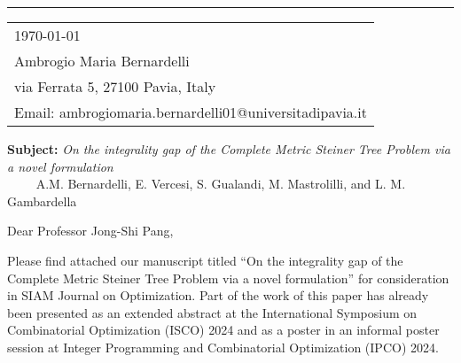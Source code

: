 \documentclass{article}
\begin{document}


\vspace{-1em} %

\rule{\linewidth}{1pt} %

\bigskip\bigskip %


\hfill
\begin{tabular}{l @{}}
	\today \bigskip\\ %
	Ambrogio Maria Bernardelli \\
	via Ferrata 5, 27100 Pavia, Italy \\ %
	Email: ambrogiomaria.bernardelli01@universitadipavia.it
\end{tabular}

\bigskip %


\textbf{Subject:} \textit{On the integrality gap of the Complete Metric Steiner Tree Problem via a novel formulation}\\
$\qquad$ A.M. Bernardelli, E. Vercesi, S. Gualandi, M. Mastrolilli, and L. M. Gambardella

\bigskip %

Dear Professor Jong-Shi Pang, 

\bigskip %

Please find attached our manuscript titled ``On the integrality gap of the Complete Metric Steiner Tree Problem via a novel formulation'' for consideration in SIAM Journal on Optimization. 
%
Part of the work of this paper has already been presented as an extended abstract at the International Symposium on Combinatorial Optimization (ISCO) 2024 and as a poster in an informal poster session at 
Integer Programming and Combinatorial Optimization (IPCO) 2024.
\end{document}
